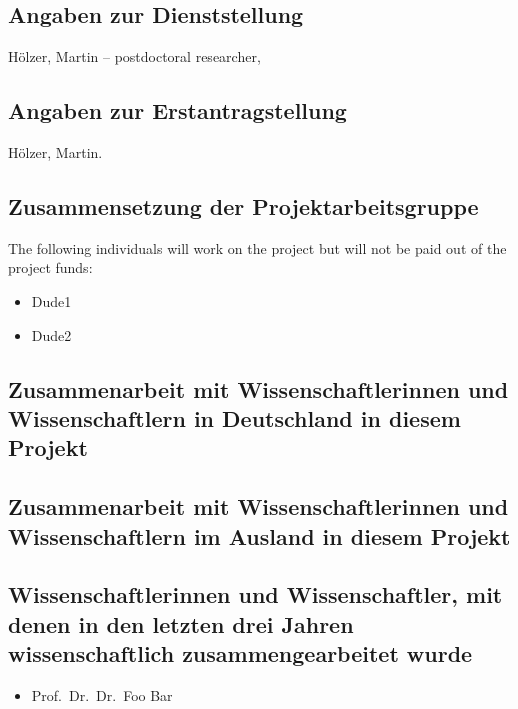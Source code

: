 \documentclass{scrartcl}
\begin{document}

\subsection{Angaben zur Dienststellung}
H\"olzer, Martin -- postdoctoral researcher, 

\subsection{Angaben zur Erstantragstellung}
H\"olzer, Martin.

\subsection{Zusammensetzung der Projektarbeitsgruppe}
The following individuals will work on the project but will not be paid out of
the project funds:

\begin{itemize}
\item Dude1
\item Dude2
\end{itemize}

\subsection{Zusammenarbeit mit Wissenschaftlerinnen und Wissenschaftlern in Deutschland in diesem Projekt}

\subsection{Zusammenarbeit mit Wissenschaftlerinnen und Wissenschaftlern im Ausland in diesem Projekt}

\subsection{Wissenschaftlerinnen und Wissenschaftler, mit denen in den letzten 
drei Jahren wissenschaftlich zusammengearbeitet wurde}
\begin{itemize}
  \item Prof.\ Dr.\ Dr.\ Foo Bar
\end{itemize}
\end{document}
